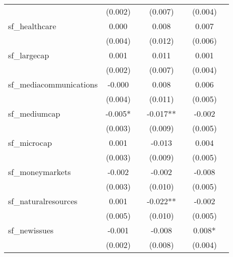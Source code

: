 {\begin{tabular}{l*{6}{c}}
            &     (0.002)   &               &     (0.007)   &               &     (0.004)   &               \\
[1em]
sf\_healthcare&       0.000   &               &       0.008   &               &       0.007   &               \\
            &     (0.004)   &               &     (0.012)   &               &     (0.006)   &               \\
[1em]
sf\_largecap &       0.001   &               &       0.011   &               &       0.001   &               \\
            &     (0.002)   &               &     (0.007)   &               &     (0.004)   &               \\
[1em]
sf\_mediacommunications&      -0.000   &               &       0.008   &               &       0.006   &               \\
            &     (0.004)   &               &     (0.011)   &               &     (0.005)   &               \\
[1em]
sf\_mediumcap&      -0.005*  &               &      -0.017** &               &      -0.002   &               \\
            &     (0.003)   &               &     (0.009)   &               &     (0.005)   &               \\
[1em]
sf\_microcap &       0.001   &               &      -0.013   &               &       0.004   &               \\
            &     (0.003)   &               &     (0.009)   &               &     (0.005)   &               \\
[1em]
sf\_moneymarkets&      -0.002   &               &      -0.002   &               &      -0.008   &               \\
            &     (0.003)   &               &     (0.010)   &               &     (0.005)   &               \\
[1em]
sf\_naturalresources&       0.001   &               &      -0.022** &               &      -0.002   &               \\
            &     (0.005)   &               &     (0.010)   &               &     (0.005)   &               \\
[1em]
sf\_newissues&      -0.001   &               &      -0.008   &               &       0.008*  &               \\
            &     (0.002)   &               &     (0.008)   &               &     (0.004)   &               \\

\end{tabular}}
